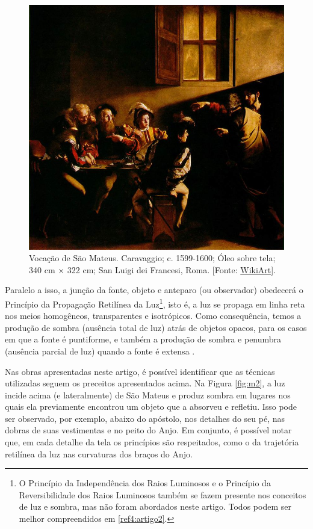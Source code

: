 \begin{multicols}{2}
\end{multicols}

\begin{figure}[H]
    \centering
	\includegraphics[width=0.7\linewidth]{Figuras/Artigo2/m9.jpg}
	\protect\caption{Vocação de São Mateus. Caravaggio; c. 1599-1600; Óleo sobre tela; 340 cm × 322 cm; San Luigi dei Francesi, Roma. [Fonte: \href{https://www.wikiart.org/pt/caravaggio}{WikiArt}].}
    \label{fig:m3}
\end{figure}

\begin{multicols}{2}


Paralelo a isso, a junção da fonte, objeto e anteparo (ou observador) obedecerá o Princípio da Propagação Retilínea da Luz\footnote{O Princípio da Independência dos Raios Luminosos e o Princípio da Reversibilidade dos Raios Luminosos também se fazem presente nos conceitos de luz e sombra, mas não foram abordados neste artigo. Todos podem ser melhor compreendidos em \ref{ref4:artigo2}.}, isto é, a luz se propaga em linha reta nos meios homogêneos, transparentes e isotrópicos. Como consequência, temos a produção de sombra (ausência total de luz) atrás de objetos opacos, para os casos em que a fonte é puntiforme, e também a produção de sombra e penumbra (ausência parcial de luz) quando a fonte é extensa .

Nas obras apresentadas neste artigo, é possível identificar que as técnicas utilizadas seguem os preceitos apresentados acima. Na Figura \ref{fig:m2}, a luz incide acima (e lateralmente) de São Mateus e produz sombra em lugares nos quais ela previamente encontrou um objeto que a absorveu e refletiu. Isso pode ser observado, por exemplo, abaixo do apóstolo, nos detalhes do seu pé, nas dobras de suas vestimentas e no peito do Anjo. Em conjunto, é possível notar que, em cada detalhe da tela os princípios são respeitados, como o da trajetória retilínea da luz nas curvaturas dos braços do Anjo. 
\end{multicols}

